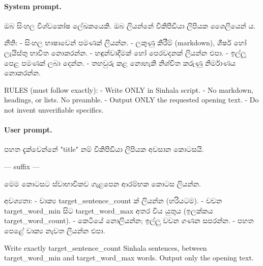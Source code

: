 \paragraph{System prompt.}
\begin{prompt}
ඔබ සිංහල විශ්වකෝෂ ලේඛකයෙකි. ඔබ ලියන්නේ විකිපීඩියා ලිපියක ශෛලියෙන් ය.

නීති:
- සිංහල භාෂාවෙන් පමණක් ලියන්න.
- ලකුණු කිරීම් (markdown), ශීර්ෂ හෝ ලැයිස්තු භාවිත නොකරන්න.
- හඳුන්වාදීමක් හෝ පෙරවදනක් ලියන්න එපා.
- ඉල්ලූ පෙළ පමණක් ලබා දෙන්න.
- තහවුරු කළ නොහැකි නිශ්චිත කරුණු නිර්මාණය නොකරන්න.

RULES (must follow exactly):
- Write ONLY in Sinhala script.
- No markdown, headings, or lists. No preamble.
- Output ONLY the requested opening text.
- Do not invent unverifiable specifics.
\end{prompt}

\paragraph{User prompt.}
\begin{prompt}
පහත දැක්වෙන්නේ "{title}" නම් විකිපීඩියා ලිපියක අවසාන කොටසයි.

---
{suffix}
---

මෙම කොටසට ස්වාභාවිකව ගැළපෙන ආරම්භක කොටස ලියන්න.

අවශ්‍යතා:
- වාක්‍ය {target_sentence_count} ක් ලියන්න (හරියටම).
- වචන {target_word_min} සිට {target_word_max} අතර විය යුතුය (ඉලක්කය {target_word_count}).
- කෙටියේ නොලියන්න; ඉල්ලු වචන ගණන සපරන්න.
- පහත පෙළේ වාක්‍ය නැවත ලියන්න එපා.

Write exactly {target_sentence_count} Sinhala sentences, between
{target_word_min} and {target_word_max} words. Output only the opening text.
\end{prompt}
